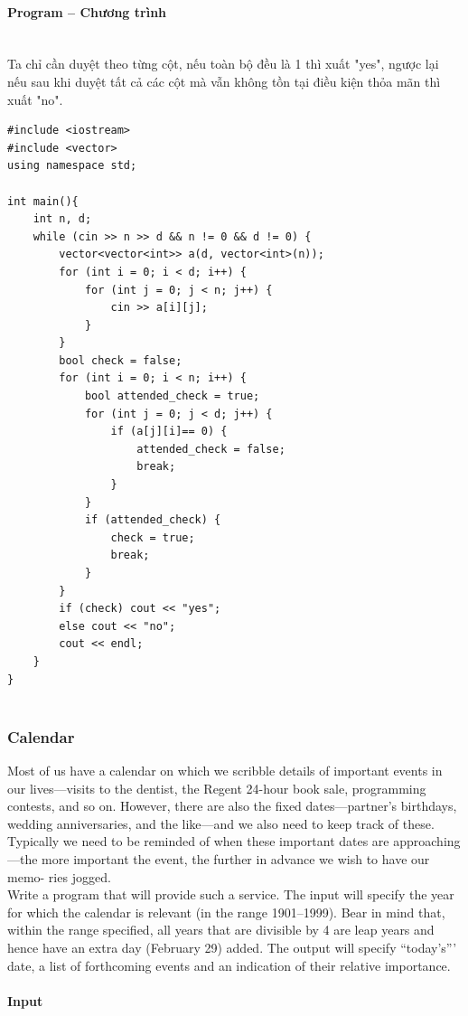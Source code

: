 \documentclass{article}
\begin{document}
\paragraph{Program -- Chương trình} \mbox{} \\
Ta chỉ cần duyệt theo từng cột, nếu toàn bộ đều là 1 thì xuất "yes", ngược lại nếu sau khi duyệt tất cả các cột mà vẫn không tồn tại điều kiện thỏa mãn thì xuất "no".

\begin{lstlisting}
#include <iostream>
#include <vector>
using namespace std;

int main(){
	int n, d;
	while (cin >> n >> d && n != 0 && d != 0) {
		vector<vector<int>> a(d, vector<int>(n));
		for (int i = 0; i < d; i++) {
			for (int j = 0; j < n; j++) {
				cin >> a[i][j];
			}
		}
		bool check = false;
		for (int i = 0; i < n; i++) {
			bool attended_check = true;
			for (int j = 0; j < d; j++) {
				if (a[j][i]== 0) {
					attended_check = false;
					break;
				}
			}
			if (attended_check) {
				check = true;
				break;
			}
		}
		if (check) cout << "yes";
		else cout << "no";
		cout << endl;
	}
}
	
\end{lstlisting}


\subsubsection{Calendar}
Most of us have a calendar on which we scribble details of important events in our lives—visits
to the dentist, the Regent 24-hour book sale, programming contests, and so on. However, there
are also the fixed dates—partner’s birthdays, wedding anniversaries, and the like—and we also
need to keep track of these. Typically we need to be reminded of when these important dates are
approaching—the more important the event, the further in advance we wish to have our memo-
ries jogged.\\
Write a program that will provide such a service. The input will specify the year for which the
calendar is relevant (in the range 1901–1999). Bear in mind that, within the range specified, all
years that are divisible by 4 are leap years and hence have an extra day (February 29) added. The
output will specify “today’s”’ date, a list of forthcoming events and an indication of their relative
importance.

\paragraph{Input} \mbox{} \\
\end{document}
